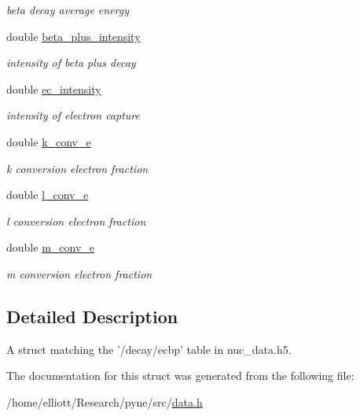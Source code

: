 \begin{DoxyCompactItemize}
\begin{DoxyCompactList}\small\item\em beta decay average energy \end{DoxyCompactList}\item 
\hypertarget{structpyne_1_1ecbp_adafb0b96525249576ccc33302c452fe8}{double \hyperlink{structpyne_1_1ecbp_adafb0b96525249576ccc33302c452fe8}{beta\-\_\-plus\-\_\-intensity}}\label{structpyne_1_1ecbp_adafb0b96525249576ccc33302c452fe8}

\begin{DoxyCompactList}\small\item\em intensity of beta plus decay \end{DoxyCompactList}\item 
\hypertarget{structpyne_1_1ecbp_a67128407e1bd8eb131b7b2764a6813d8}{double \hyperlink{structpyne_1_1ecbp_a67128407e1bd8eb131b7b2764a6813d8}{ec\-\_\-intensity}}\label{structpyne_1_1ecbp_a67128407e1bd8eb131b7b2764a6813d8}

\begin{DoxyCompactList}\small\item\em intensity of electron capture \end{DoxyCompactList}\item 
\hypertarget{structpyne_1_1ecbp_a3bb382193d514ddbda7baf4796a025d5}{double \hyperlink{structpyne_1_1ecbp_a3bb382193d514ddbda7baf4796a025d5}{k\-\_\-conv\-\_\-e}}\label{structpyne_1_1ecbp_a3bb382193d514ddbda7baf4796a025d5}

\begin{DoxyCompactList}\small\item\em k conversion electron fraction \end{DoxyCompactList}\item 
\hypertarget{structpyne_1_1ecbp_a4de2fa13e0520b5fd840cc53ad8f52dd}{double \hyperlink{structpyne_1_1ecbp_a4de2fa13e0520b5fd840cc53ad8f52dd}{l\-\_\-conv\-\_\-e}}\label{structpyne_1_1ecbp_a4de2fa13e0520b5fd840cc53ad8f52dd}

\begin{DoxyCompactList}\small\item\em l conversion electron fraction \end{DoxyCompactList}\item 
\hypertarget{structpyne_1_1ecbp_afed47f1b2eea323a4de63f67fdd236c6}{double \hyperlink{structpyne_1_1ecbp_afed47f1b2eea323a4de63f67fdd236c6}{m\-\_\-conv\-\_\-e}}\label{structpyne_1_1ecbp_afed47f1b2eea323a4de63f67fdd236c6}

\begin{DoxyCompactList}\small\item\em m conversion electron fraction \end{DoxyCompactList}\end{DoxyCompactItemize}


\subsection{Detailed Description}
A struct matching the '/decay/ecbp' table in nuc\-\_\-data.\-h5. 

The documentation for this struct was generated from the following file\-:\begin{DoxyCompactItemize}
\item 
/home/elliott/\-Research/pyne/src/\hyperlink{data_8h}{data.\-h}\end{DoxyCompactItemize}
